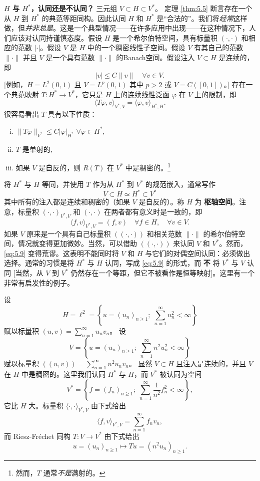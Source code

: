 \begin{remark}\label{rem:5.3}
\textbf{$H$ 与 $H^*$，认同还是不认同？} 三元组 $V \subset H \subset V^*$。
定理 \ref{thm:5.5} 断言存在一个从 $H$ 到 $H^*$ 的典范等距同构。因此认同 $H$ 和 $H^*$ 是“合法的”。我们将\textit{经常}这样做，但\textit{并非总是}。这是一个典型情况——在许多应用中出现——在这种情况下，人们应该对认同持谨慎态度。假设 $H$ 是一个希尔伯特空间，具有标量积 $(\cdot, \cdot)$ 和相应的范数 $|\cdot|$。假设 $V$ 是 $H$ 中的一个稠密线性子空间。假设 $V$ 有其自己的范数 $\|\cdot\|$ 并且 $V$ 是一个具有范数 $\|\cdot\|$ 的Banach空间。假设注入 $V \subset H$ 是连续的，即
\[ |v| \le C \|v\| \quad \forall v \in V. \]
[例如，$H = L^2(0,1)$ 且 $V=L^p(0,1)$ 其中 $p>2$ 或 $V=C([0,1])$。] 存在一个典范映射 $T: H^* \to V^*$，它只是 $H$ 上的连续线性泛函 $\varphi$ 在 $V$ 上的限制，即
\[ \langle T\varphi, v \rangle_{V^*, V} = \langle \varphi, v \rangle_{H^*, H}. \]
很容易看出 $T$ 具有以下性质：
\begin{enumerate}[(i)]
    \item $\|T\varphi\|_{V^*} \le C |\varphi|_{H^*}$ \quad $\forall \varphi \in H^*$,
    \item $T$ 是单射的,
    \item 如果 $V$ 是自反的，则 $R(T)$ 在 $V^*$ 中是稠密的。\footnote{然而，$T$ 通常\textit{不是}满射的。}
\end{enumerate}
将 $H^*$ 与 $H$ 等同，并使用 $T$ 作为从 $H^*$ 到 $V^*$ 的规范嵌入，通常写作
\begin{equation}\label{eq:5.9}
\boxed{V \subset H \simeq H^* \subset V^*}
\end{equation}
其中所有的注入都是连续和稠密的（如果 $V$ 是自反的）。称 $H$ 为 \textbf{枢轴空间}。注意，标量积 $(\cdot, \cdot)_{V^*,V}$ 和 $(\cdot, \cdot)$ 在两者都有意义时是一致的，即
\[ \langle f, v \rangle_{V^*,V} = (f,v) \quad \forall f \in H, \quad \forall v \in V. \]
如果 $V$ 原来是一个具有自己标量积 $((\cdot, \cdot))$ 和相关范数 $\|\cdot\|$ 的希尔伯特空间，情况就变得更加微妙。当然，可以借助 $((\cdot, \cdot))$ 来认同 $V$ 和 $V^*$。然而，\eqref{eq:5.9} 变得荒谬。这表明不能同时将 $V$ 和 $H$ 与它们的对偶空间认同：必须做出选择。通常的习惯是将 $H^*$ 与 $H$ 认同，写成 \eqref{eq:5.9} 的形式，而 \textbf{不} 将 $V^*$ 与 $V$ 认同 [当然，从 $V$ 到 $V^*$ 仍然存在一个等距，但它不被看作是恒等映射]。这里有一个非常有启发性的例子。

设
\[ H = \ell^2 = \left\{ u=(u_n)_{n \ge 1}; \; \sum_{n=1}^\infty u_n^2 < \infty \right\} \]
赋以标量积 $(u,v) = \sum_{n=1}^\infty u_n v_n$。
设
\[ V = \left\{ u=(u_n)_{n \ge 1}; \; \sum_{n=1}^\infty n^2 u_n^2 < \infty \right\} \]
赋以标量积 $((u,v)) = \sum_{n=1}^\infty n^2 u_n v_n$。
显然 $V \subset H$ 且注入是连续的，并且 $V$ 在 $H$ 中是稠密的。这里我们认同 $H^*$ 与 $H$，而 $V^*$ 被认同为空间
\[ V^* = \left\{ f=(f_n)_{n \ge 1}; \; \sum_{n=1}^\infty \frac{1}{n^2} f_n^2 < \infty \right\}, \]
它比 $H$ 大。标量积 $\langle \cdot, \cdot \rangle_{V^*,V}$ 由下式给出
\[ \langle f,v \rangle_{V^*,V} = \sum_{n=1}^\infty f_n v_n, \]
而 Riesz-Fréchet 同构 $T: V \to V^*$ 由下式给出
\[ u=(u_n)_{n \ge 1} \mapsto Tu = (n^2 u_n)_{n \ge 1}. \]
\end{remark}

